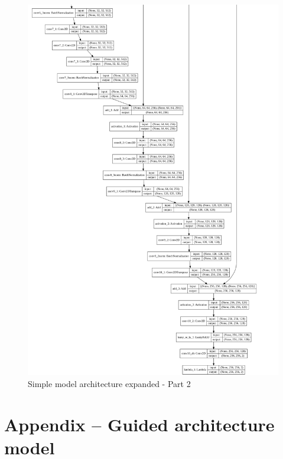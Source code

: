 \documentclass[12pt,openright,oneside,a4paper,english]{abntex2}
\begin{document}
\begin{otherlanguage}{english}
\begin{figure}[!htb]
\centering
\includegraphics[height=\textheight]{model_plot/Simple2}
\caption{Simple model architecture expanded - Part 2}
\label{simple_plot_2}
\end{figure}

\chapter{Appendix -- Guided architecture model}


\end{otherlanguage}
\end{document}
